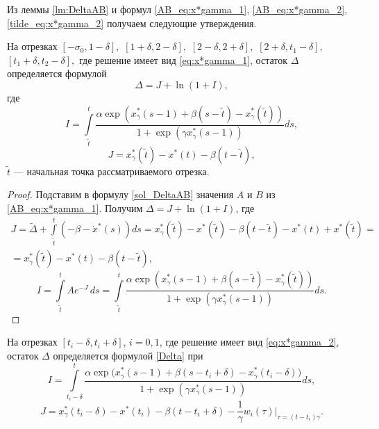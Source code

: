 Из леммы \ref{lm:DeltaAB} и формул \eqref{AB_eq:x*gamma_1}, \eqref{AB_eq:x*gamma_2}, \eqref{tilde_eq:x*gamma_2} получаем следующие утверждения.
\begin{corollary}\label{corol_Delta_long}
На отрезках $[-\sigma_0, 1 - \delta],$ $[1 + \delta, 2 - \delta],$ $[2 - \delta, 2 + \delta],$ $[2 + \delta, t_1 - \delta],$ $[t_1 + \delta,t_2 - \delta],$ где решение имеет вид \eqref{eq:x*gamma_1}, остаток $\Delta$ определяется формулой
\begin{equation}
    \label{Delta}
    \Delta = J + \ln(1 + I),
\end{equation}
где 
\begin{equation}
    \label{I_long}
    I = \int\limits_{\tilde{t}}^{t}\frac{\alpha\exp(x_{\gamma}^*(s-1)+\beta(s-\tilde{t})-x_{\gamma}^*(\tilde{t}))}{1 + \exp(\gamma x_{\gamma}^*(s-1))} ds,
\end{equation}
%
\begin{equation}\label{eq:J_long}
    J = x_{\gamma}^*(\tilde{t}) - x^*(t) - \beta(t - \tilde{t}),
\end{equation}
%
$\tilde{t}$ --- начальная точка рассматриваемого отрезка.
\end{corollary}
%
\begin{proof}
	Подставим в формулу \eqref{sol_DeltaAB} значения $A$ и $B$ из \eqref{AB_eq:x*gamma_1}. Получим $\Delta = J + \ln(1 + I)$, где
\begin{multline*}
	J = \tilde{\Delta} + \int\limits_{\tilde{t}}^{t}(-\beta - \dot{x}^*(s))ds = x_{\gamma}^*(\tilde{t}) - x^*(\tilde{t}) - \beta(t - \tilde{t}) - x^*(t) + x^*(\tilde{t}) =\\= x_{\gamma}^*(\tilde{t}) - x^*(t) - \beta(t - \tilde{t}),
\end{multline*}
\[
	I = \int\limits_{\tilde{t}}^{t} A e^{-J} \, ds = \int\limits_{\tilde{t}}^{t}\frac{\alpha\exp(x_{\gamma}^*(s-1)+\beta(s-\tilde{t})-x_{\gamma}^*(\tilde{t}))}{1 + \exp(\gamma x_{\gamma}^*(s-1))} ds.
\]
\end{proof}
%
\begin{corollary}\label{corol_Delta_short}
На отрезках $[t_i - \delta, t_i + \delta]$, $i=0, 1$, где решение имеет вид \eqref{eq:x*gamma_2}, остаток $\Delta$ определяется формулой \eqref{Delta} при
 \begin{equation}
    \label{I_point}
   I=\int\limits_{t_i-\delta}^{t}\frac{\alpha\exp\big(x_{\gamma}^*(s-1)+\beta(s-t_i+\delta)-x_{\gamma}^*(t_i-\delta)\big)}{1+\exp(\gamma x_{\gamma}^*(s-1))}ds,
\end{equation}
%
\begin{equation}
    \label{J_point}
    J=x_{\gamma}^*(t_i - \delta) - x^*(t_i) - \beta(t-t_i+\delta) - \frac{1}{\gamma} w_i(\tau)|_{\tau=(t-t_i)\gamma}.
\end{equation}
\end{corollary}
